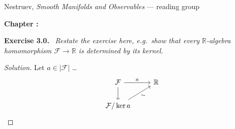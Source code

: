 \documentclass[11pt,a4paper]{article}
\author{Your Name}
\date{\today}
\makeatletter
\newcommand{\dg@chapnum}{}
\newcommand{\dg@chaptitle}{}
\renewcommand{\maketitle}{%
  \begin{center}
    {\small Nestruev, \emph{Smooth Manifolds and Observables} --- reading group}\par
    \vspace{0.6em}
    {\Large\bfseries Chapter \dg@chapnum: \dg@chaptitle}\par
    \vspace{0.4em}
    {\normalsize \@author}\par
    {\small \@date}\par
  \end{center}
  \vspace{1em}}
\theoremstyle{plain}
\theoremstyle{definition}
\theoremstyle{remark}
\newenvironment{exercise}[1]
  {\par\medskip\noindent\textbf{Exercise #1.}\ \itshape}
  {\par\medskip}
\newenvironment{solution}
  {\begin{proof}[Solution]}
  {\end{proof}}
\newcommand{\R}{\mathbb{R}}
\newcommand{\F}{\mathcal{F}}            %
\newcommand{\dual}[1]{\lvert #1 \rvert}
\makeatother
\begin{document}
\maketitle

\begin{exercise}{3.0}
  Restate the exercise here, e.g.\ show that every $\R$-algebra
  homomorphism $\F \to \R$ is determined by its kernel.
\end{exercise}

\begin{solution}
  Let $a \in \dual{\F}$ \dots
  \[
    \begin{tikzcd}
      \F \arrow[r, "a"] \arrow[d] & \R \\
      \F/\ker a \arrow[ur, "\sim"']
    \end{tikzcd}
  \]
\end{solution}
\end{document}
